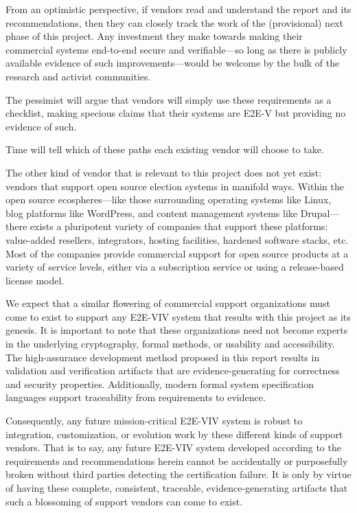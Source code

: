 From an optimistic perspective, if vendors read and understand the
report and its recommendations, then they can closely track the work
of the (provisional) next phase of this project. Any investment they
make towards making their commercial systems end-to-end secure and
verifiable---so long as there is publicly available evidence of such
improvements---would be welcome by the bulk of the research and
activist communities.

The pessimist will argue that vendors will simply use these
requirements as a checklist, making specious claims that their systems
are E2E-V but providing no evidence of such.

Time will tell which of these paths each existing vendor will choose
to take.

The other kind of vendor that is relevant to this project does not yet
exist: vendors that support open source election systems in manifold
ways. Within the open source ecospheres---like those surrounding
operating systems like Linux, blog platforms like WordPress, and
content management systems like Drupal---there exists a pluripotent
variety of companies that support these platforms: value-added
resellers, integrators, hosting facilities, hardened software stacks,
etc. Most of the companies provide commercial support for
open source products at a variety of service levels, either via a
subscription service or using a release-based license model.

We expect that a similar flowering of commercial support organizations
must come to exist to support any E2E-VIV system that results with
this project as its genesis. It is important to note that these
organizations need not become experts in the underlying cryptography,
formal methods, or usability and accessibility. The high-assurance
development method proposed in this report results in validation and
verification artifacts that are evidence-generating for correctness
and security properties.  Additionally, modern formal system
specification languages support traceability from requirements to
evidence. 

Consequently, any future mission-critical E2E-VIV system is robust to
integration, customization, or evolution work by these different kinds
of support vendors. That is to say, any future E2E-VIV system
developed according to the requirements and recommendations herein
cannot be accidentally or purposefully broken without third parties
detecting the certification failure. It is only by virtue of having
these complete, consistent, traceable, evidence-generating artifacts
that such a blossoming of support vendors can come to exist.

